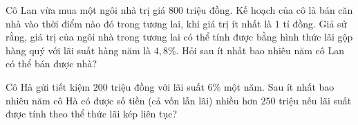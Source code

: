 \begin{ex}%
	Cô Lan vừa mua một ngôi nhà trị giá $800$ triệu đồng. Kế hoạch của cô là bán căn nhà vào thời điểm nào đó trong tương lai, khi giá trị ít nhất là $1$ tỉ đồng. Giả sử rằng, giá trị của ngôi nhà trong tương lai có thể tính được bằng hình thức lãi gộp hàng quý với lãi suất hàng năm là $4{,}8\%$. Hỏi sau ít nhất bao nhiêu năm cô Lan có thể bán được nhà?
\end{ex}

\begin{ex}%
	Cô Hà gửi tiết kiệm $200$ triệu đồng với lãi suất $6\%$ một năm. Sau ít nhất bao nhiêu năm cô Hà có được số tiền (cả vốn lẫn lãi) nhiều hơn $250$ triệu nếu lãi suất được tính theo thể thức lãi kép liên tục?
	
\end{ex}

